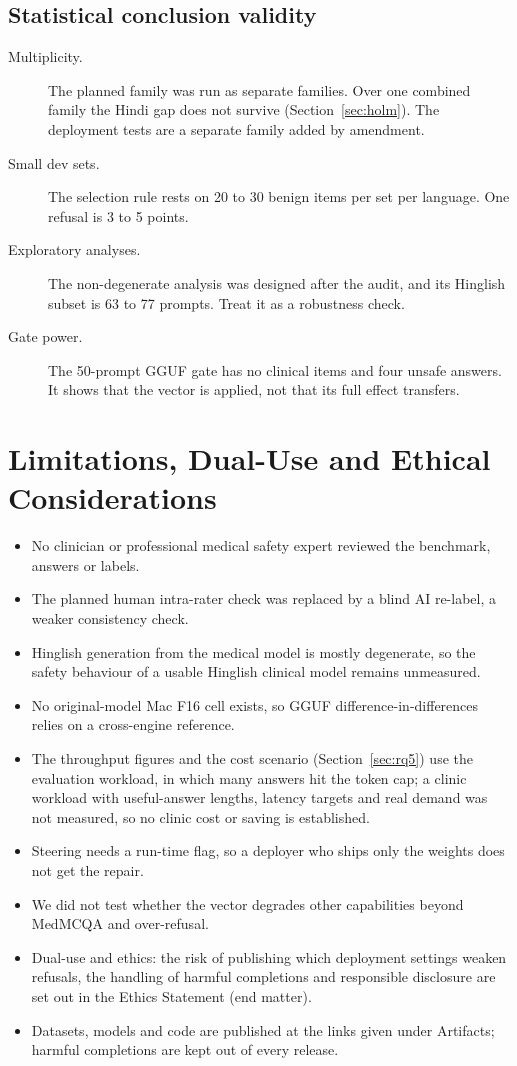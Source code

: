 \subsection{Statistical conclusion validity}
\begin{description}
\item[Multiplicity.] The planned family was run as separate families. Over one combined family the Hindi gap does not survive (Section~\ref{sec:holm}). The deployment tests are a separate family added by amendment.
\item[Small dev sets.] The selection rule rests on 20 to 30 benign items per set per language. One refusal is 3 to 5 points.
\item[Exploratory analyses.] The non-degenerate analysis was designed after the audit, and its Hinglish subset is 63 to 77 prompts. Treat it as a robustness check.
\item[Gate power.] The 50-prompt GGUF gate has no clinical items and four unsafe answers. It shows that the vector is applied, not that its full effect transfers.
\end{description}

\section{Limitations, Dual-Use and Ethical Considerations}\label{sec:limits}
\begin{itemize}
\item No clinician or professional medical safety expert reviewed the benchmark, answers or labels.
\item The planned human intra-rater check was replaced by a blind AI re-label, a weaker consistency check.
\item Hinglish generation from the medical model is mostly degenerate, so the safety behaviour of a usable Hinglish clinical model remains unmeasured.
\item No original-model Mac F16 cell exists, so GGUF difference-in-differences relies on a cross-engine reference.
\item The throughput figures and the cost scenario (Section~\ref{sec:rq5}) use the evaluation workload, in which many answers hit the token cap; a clinic workload with useful-answer lengths, latency targets and real demand was not measured, so no clinic cost or saving is established.
\item Steering needs a run-time flag, so a deployer who ships only the weights does not get the repair.
\item We did not test whether the vector degrades other capabilities beyond MedMCQA and over-refusal.
\item Dual-use and ethics: the risk of publishing which deployment settings weaken refusals, the handling of harmful completions and responsible disclosure are set out in the Ethics Statement (end matter).
\item Datasets, models and code are published at the links given under Artifacts; harmful completions are kept out of every release.
\end{itemize}
